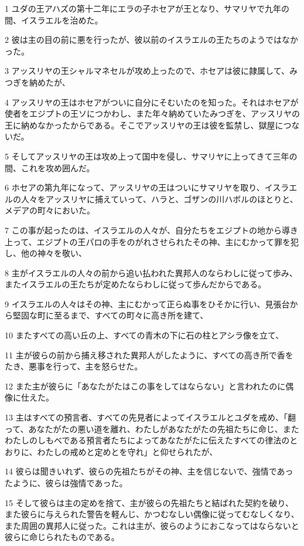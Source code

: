 \par 1 ユダの王アハズの第十二年にエラの子ホセアが王となり、サマリヤで九年の間、イスラエルを治めた。
\par 2 彼は主の目の前に悪を行ったが、彼以前のイスラエルの王たちのようではなかった。
\par 3 アッスリヤの王シャルマネセルが攻め上ったので、ホセアは彼に隷属して、みつぎを納めたが、
\par 4 アッスリヤの王はホセアがついに自分にそむいたのを知った。それはホセアが使者をエジプトの王ソにつかわし、また年々納めていたみつぎを、アッスリヤの王に納めなかったからである。そこでアッスリヤの王は彼を監禁し、獄屋につないだ。
\par 5 そしてアッスリヤの王は攻め上って国中を侵し、サマリヤに上ってきて三年の間、これを攻め囲んだ。
\par 6 ホセアの第九年になって、アッスリヤの王はついにサマリヤを取り、イスラエルの人々をアッスリヤに捕えていって、ハラと、ゴザンの川ハボルのほとりと、メデアの町々においた。
\par 7 この事が起ったのは、イスラエルの人々が、自分たちをエジプトの地から導き上って、エジプトの王パロの手をのがれさせられたその神、主にむかって罪を犯し、他の神々を敬い、
\par 8 主がイスラエルの人々の前から追い払われた異邦人のならわしに従って歩み、またイスラエルの王たちが定めたならわしに従って歩んだからである。
\par 9 イスラエルの人々はその神、主にむかって正らぬ事をひそかに行い、見張台から堅固な町に至るまで、すべての町々に高き所を建て、
\par 10 またすべての高い丘の上、すべての青木の下に石の柱とアシラ像を立て、
\par 11 主が彼らの前から捕え移された異邦人がしたように、すべての高き所で香をたき、悪事を行って、主を怒らせた。
\par 12 また主が彼らに「あなたがたはこの事をしてはならない」と言われたのに偶像に仕えた。
\par 13 主はすべての預言者、すべての先見者によってイスラエルとユダを戒め、「翻って、あなたがたの悪い道を離れ、わたしがあなたがたの先祖たちに命じ、またわたしのしもべである預言者たちによってあなたがたに伝えたすべての律法のとおりに、わたしの戒めと定めとを守れ」と仰せられたが、
\par 14 彼らは聞きいれず、彼らの先祖たちがその神、主を信じないで、強情であったように、彼らは強情であった。
\par 15 そして彼らは主の定めを捨て、主が彼らの先祖たちと結ばれた契約を破り、また彼らに与えられた警告を軽んじ、かつむなしい偶像に従ってむなしくなり、また周囲の異邦人に従った。これは主が、彼らのようにおこなってはならないと彼らに命じられたものである。
